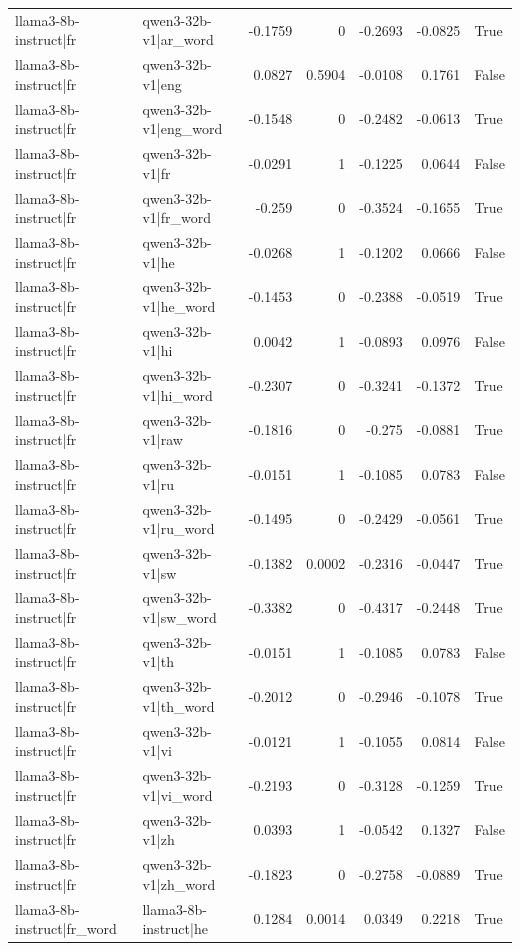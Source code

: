 \begin{table}
\begin{tabular}{l l r r r r l}
llama3-8b-instruct|fr & qwen3-32b-v1|ar_word & -0.1759 & 0 & -0.2693 & -0.0825 & True \\
llama3-8b-instruct|fr & qwen3-32b-v1|eng & 0.0827 & 0.5904 & -0.0108 & 0.1761 & False \\
llama3-8b-instruct|fr & qwen3-32b-v1|eng_word & -0.1548 & 0 & -0.2482 & -0.0613 & True \\
llama3-8b-instruct|fr & qwen3-32b-v1|fr & -0.0291 & 1 & -0.1225 & 0.0644 & False \\
llama3-8b-instruct|fr & qwen3-32b-v1|fr_word & -0.259 & 0 & -0.3524 & -0.1655 & True \\
llama3-8b-instruct|fr & qwen3-32b-v1|he & -0.0268 & 1 & -0.1202 & 0.0666 & False \\
llama3-8b-instruct|fr & qwen3-32b-v1|he_word & -0.1453 & 0 & -0.2388 & -0.0519 & True \\
llama3-8b-instruct|fr & qwen3-32b-v1|hi & 0.0042 & 1 & -0.0893 & 0.0976 & False \\
llama3-8b-instruct|fr & qwen3-32b-v1|hi_word & -0.2307 & 0 & -0.3241 & -0.1372 & True \\
llama3-8b-instruct|fr & qwen3-32b-v1|raw & -0.1816 & 0 & -0.275 & -0.0881 & True \\
llama3-8b-instruct|fr & qwen3-32b-v1|ru & -0.0151 & 1 & -0.1085 & 0.0783 & False \\
llama3-8b-instruct|fr & qwen3-32b-v1|ru_word & -0.1495 & 0 & -0.2429 & -0.0561 & True \\
llama3-8b-instruct|fr & qwen3-32b-v1|sw & -0.1382 & 0.0002 & -0.2316 & -0.0447 & True \\
llama3-8b-instruct|fr & qwen3-32b-v1|sw_word & -0.3382 & 0 & -0.4317 & -0.2448 & True \\
llama3-8b-instruct|fr & qwen3-32b-v1|th & -0.0151 & 1 & -0.1085 & 0.0783 & False \\
llama3-8b-instruct|fr & qwen3-32b-v1|th_word & -0.2012 & 0 & -0.2946 & -0.1078 & True \\
llama3-8b-instruct|fr & qwen3-32b-v1|vi & -0.0121 & 1 & -0.1055 & 0.0814 & False \\
llama3-8b-instruct|fr & qwen3-32b-v1|vi_word & -0.2193 & 0 & -0.3128 & -0.1259 & True \\
llama3-8b-instruct|fr & qwen3-32b-v1|zh & 0.0393 & 1 & -0.0542 & 0.1327 & False \\
llama3-8b-instruct|fr & qwen3-32b-v1|zh_word & -0.1823 & 0 & -0.2758 & -0.0889 & True \\
llama3-8b-instruct|fr_word & llama3-8b-instruct|he & 0.1284 & 0.0014 & 0.0349 & 0.2218 & True \\

\end{tabular}
\end{table}
